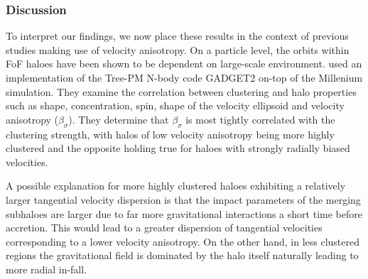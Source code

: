 \subsubsection{Discussion}
To interpret our findings, we now place these results in the context of previous studies making use of velocity anisotropy. On a particle level, the orbits within FoF haloes have been shown to be dependent on large-scale environment. \citet{faltenbacher2010} used an implementation of the Tree-PM N-body code GADGET2 on-top of the Millenium simulation. They examine the correlation between clustering and halo properties such as shape, concentration, spin, shape of the velocity ellipsoid and velocity anisotropy ($\beta_{\sigma}$). They determine that $\beta_{\sigma}$ is most tightly correlated with the clustering strength, with halos of low velocity anisotropy being more highly clustered and the opposite holding true for haloes with strongly radially biased velocities. 

A possible explanation for more highly clustered haloes exhibiting a relatively larger tangential velocity dispersion is that the impact parameters of the merging subhaloes are larger due to far more gravitational interactions a short time before accretion. This would lead to a greater dispersion of tangential velocities corresponding to a lower velocity anisotropy. On the other hand, in less clustered regions the gravitational field is dominated by the halo itself naturally leading to more radial in-fall.


